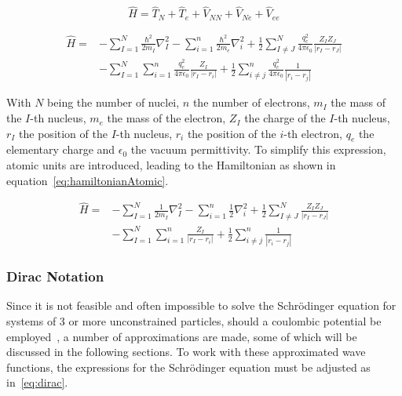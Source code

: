 \documentclass[12pt]{article}
\begin{document}
\begin{equation}
  \hat{H} = \hat{T}_N + \hat{T}_e + \hat{V}_{NN} + \hat{V}_{Ne} + \hat{V}_{ee}
  \label{eq:hamiltonian3}
\end{equation}

\begin{equation}
  \begin{aligned}
    \hat{H} = & -\sum_{I=1}^{N}\frac{\hbar^2}{2m_I}\nabla_I^2 -\sum_{i=1}^{n}\frac{\hbar^2}{2m_e}\nabla_i^2 + \frac{1}{2} \sum_{I\neq J}^{N} \frac{q_{e}^2}{4\pi \epsilon_0}\frac{Z_I Z_J}{|r_I - r_J|} \\
    & - \sum_{I=1}^{N}\sum_{i=1}^{n}\frac{q_{e}^2}{4\pi \epsilon_0}\frac{Z_I}{|r_I - r_i|} + \frac{1}{2}\sum_{i\neq j}^{n}\frac{q_{e}^2}{4\pi \epsilon_0}\frac{1}{|r_i - r_j|}
  \end{aligned}
  \label{eq:hamiltonian2}
\end{equation}

\bigskip

\noindent With $N$ being the number of nuclei, $n$ the number of electrons, $m_I$ the mass of the $I$-th nucleus, $m_e$ the mass of the electron, $Z_I$ the charge of the $I$-th nucleus, $r_I$ the position of the $I$-th nucleus, $r_i$ the position of the $i$-th electron, $q_e$ the elementary charge and $\epsilon_0$ the vacuum permittivity.
To simplify this expression, atomic units are introduced, leading to the Hamiltonian as shown in equation~\ref{eq:hamiltonianAtomic}.

\bigskip

\begin{equation}
  \begin{aligned}
    \hat{H} = & -\sum_{I=1}^{N}\frac{1}{2m_I}\nabla_I^2 -\sum_{i=1}^{n}\frac{1}{2}\nabla_i^2 + \frac{1}{2} \sum_{I\neq J}^{N} \frac{Z_I Z_J}{|r_I - r_J|} \\
    & - \sum_{I=1}^{N}\sum_{i=1}^{n}\frac{Z_I}{|r_I - r_i|} + \frac{1}{2}\sum_{i\neq j}^{n}\frac{1}{|r_i - r_j|}
  \end{aligned}
  \label{eq:hamiltonianAtomic}
\end{equation}

\bigskip

\subsubsection{Dirac Notation}
Since it is not feasible and often impossible to solve the Schrödinger equation for systems of 3 or more unconstrained particles, should a coulombic potential be employed~\cite{Toli2019}, a number of approximations are made, some of which will be discussed in the following sections. 
To work with these approximated wave functions, the expressions for the Schrödinger equation must be adjusted as in~\ref{eq:dirac}. 
\end{document}
